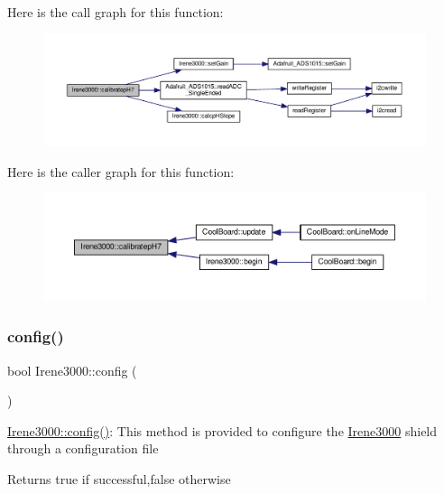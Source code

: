 Here is the call graph for this function\+:\nopagebreak
\begin{figure}[H]
\begin{center}
\leavevmode
\includegraphics[width=350pt]{class_irene3000_a1d3299202e4cb7afcff9c9e3e95d94c1_cgraph}
\end{center}
\end{figure}
Here is the caller graph for this function\+:\nopagebreak
\begin{figure}[H]
\begin{center}
\leavevmode
\includegraphics[width=350pt]{class_irene3000_a1d3299202e4cb7afcff9c9e3e95d94c1_icgraph}
\end{center}
\end{figure}
\mbox{\label{class_irene3000_afed5c35e4b23963c157847ef27c11e9c}} 
\subsubsection{\texorpdfstring{config()}{config()}}
{\footnotesize\ttfamily bool Irene3000\+::config (\begin{DoxyParamCaption}{ }\end{DoxyParamCaption})}

\hyperlink{class_irene3000_afed5c35e4b23963c157847ef27c11e9c}{Irene3000\+::config()}\+: This method is provided to configure the \hyperlink{class_irene3000}{Irene3000} shield through a configuration file

\begin{DoxyReturn}{Returns}
true if successful,false otherwise 
\end{DoxyReturn}


